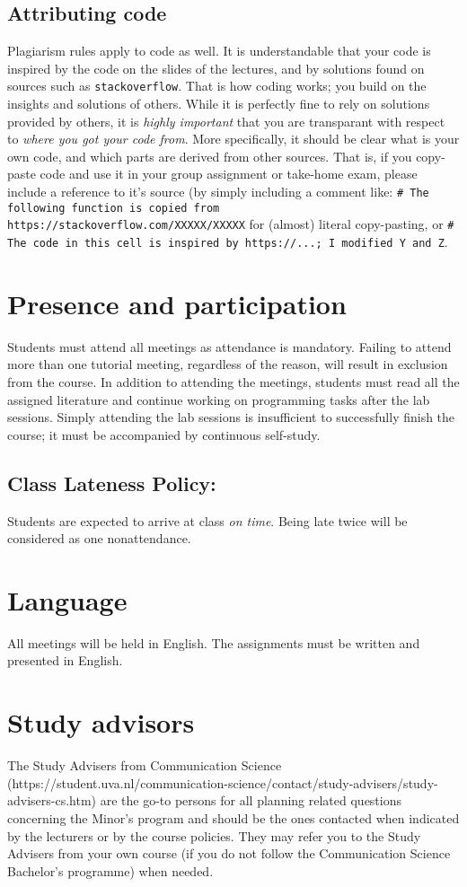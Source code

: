 \documentclass[a4paper,10pt,twocolumn]{report}
\begin{document}
\subsection{Attributing code}
Plagiarism rules apply to code as well. It is understandable that your code is inspired by the code on the slides of the lectures, and by solutions found on sources such as \texttt{stackoverflow}. That is how coding works; you build on the insights and solutions of others. While it is perfectly fine to rely on solutions provided by others, it is \emph{highly important} that you are transparant with respect to \emph{where you got your code from}. More specifically, it should be clear what is your own code, and which parts are derived from other sources. That is, if you copy-paste code and use it in your group assignment or take-home exam, please include a reference to it's source (by simply including a comment like: \texttt{\# The following function is copied from https://stackoverflow.com/XXXXX/XXXXX} for (almost) literal copy-pasting, or \texttt{\# The code in this cell is inspired by https://...; I modified Y and Z}. 

\section{Presence and participation}
Students must attend all meetings as attendance is mandatory. Failing to attend more than one tutorial meeting, regardless of the reason, will result in exclusion from the course. In addition to attending the meetings, students must read all the assigned literature and continue working on programming tasks after the lab sessions. Simply attending the lab sessions is insufficient to successfully finish the course; it must be accompanied by continuous self-study.

\subsection{Class Lateness Policy:} Students are expected to arrive at class \emph{on time}. Being late twice will be considered as one nonattendance. \\

\section{Language}
All meetings will be held in English. The assignments must be written and presented in English. 

\section{Study advisors}
The Study Advisers from Communication Science (https://student.uva.nl/communication-science/contact/study-advisers/study-advisers-cs.htm) are the go-to persons for all planning related questions concerning the Minor’s program and should be the ones contacted when indicated by the lecturers or by the course policies. They may refer you to the Study Advisers from your own course (if you do not follow the Communication Science Bachelor’s programme) when needed. 
\end{document}
